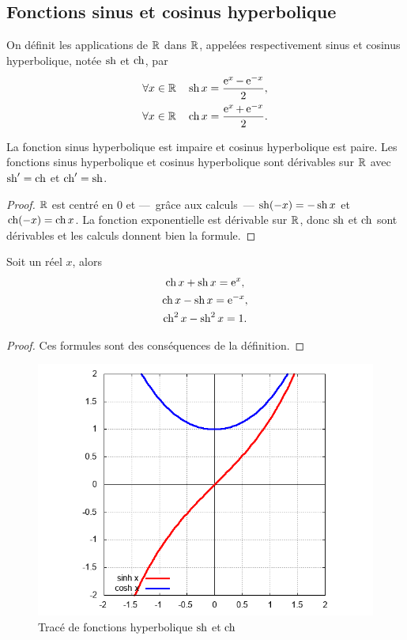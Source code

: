 \subsection{Fonctions sinus et cosinus hyperbolique}
\label{subsec:chap1-sinushetcosh}
\begin{defdef}
  On définit les applications de $\mathbb{R}$ dans $\mathbb{R}$, appelées respectivement sinus et cosinus hyperbolique, notée $\operatorname{sh}$ et $\operatorname{ch}$, par
  \begin{gather}
    \forall x \in \mathbb{R} \quad \operatorname{sh} x = \frac{\operatorname{e}^x - \operatorname{e}^{-x}}{2}, \\
    \forall x \in \mathbb{R} \quad \operatorname{ch} x = \frac{\operatorname{e}^x + \operatorname{e}^{-x}}{2}.
  \end{gather}
\end{defdef}
%
\begin{prop}
  La fonction sinus hyperbolique est impaire et cosinus hyperbolique est paire. Les fonctions sinus hyperbolique et cosinus hyperbolique sont dérivables sur $\mathbb{R}$ avec $\operatorname{sh}'=\operatorname{ch}$ et $\operatorname{ch}'=\operatorname{sh}$.
\end{prop}
\begin{proof}
  $\mathbb{R}$ est centré en $0$ et ---~grâce aux calculs~--- $\operatorname{sh}(-x)=-\operatorname{sh} x$ et $\operatorname{ch}(-x)=\operatorname{ch} x$. La fonction exponentielle est dérivable sur $\mathbb{R}$, donc $\operatorname{sh}$ et $\operatorname{ch}$ sont dérivables et les calculs donnent bien la formule.
\end{proof}
%
\begin{prop} Soit un réel $x$, alors
\begin{gather}
  \operatorname{ch} x + \operatorname{sh} x = \operatorname{e}^x, \\
  \operatorname{ch} x - \operatorname{sh} x = \operatorname{e}^{-x}, \\
  \operatorname{ch}^2 x - \operatorname{sh}^2 x = 1.
\end{gather}
\end{prop}
\begin{proof}
  Ces formules sont des conséquences de la définition.
\end{proof}
%
\begin{figure}
  \centering
  \includegraphics[scale=0.4,angle=-90]{trigh.png}
  \caption{Tracé de fonctions hyperbolique $\operatorname{sh}$ et $\operatorname{ch}$}
  \label{fig:tracesinhcosh}
\end{figure}
